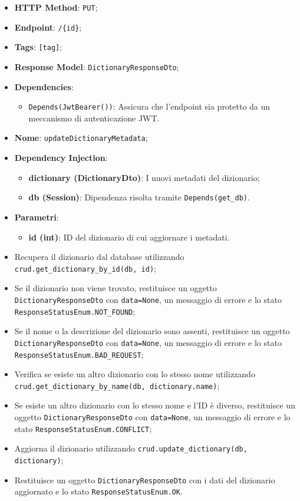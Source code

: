 \begin{itemize}
 \item \textbf{HTTP Method}: \texttt{PUT};
 \item \textbf{Endpoint}: \texttt{/\{id\}};
 \item \textbf{Tags}: \texttt{[tag]};
 \item \textbf{Response Model}: \texttt{DictionaryResponseDto};
 \item \textbf{Dependencies}:
  \begin{itemize}
    \item \texttt{Depends(JwtBearer())}: Assicura che l'endpoint sia protetto da un meccanismo di autenticazione JWT.
  \end{itemize}
 \item \textbf{Nome}: \texttt{updateDictionaryMetadata};
 \item \textbf{Dependency Injection}:
  \begin{itemize}
    \item \textbf{dictionary (DictionaryDto)}: I nuovi metadati del dizionario;
    \item \textbf{db (Session)}: Dipendenza risolta tramite \texttt{Depends(get\_db)}.
  \end{itemize}
 \item \textbf{Parametri}:
  \begin{itemize}
    \item \textbf{id (int)}: ID del dizionario di cui aggiornare i metadati.
  \end{itemize}
\end{itemize}

\begin{itemize}
 \item Recupera il dizionario dal database utilizzando \texttt{crud.get\_dictionary\_by\_id(db, id)};
 \item Se il dizionario non viene trovato, restituisce un oggetto \texttt{DictionaryResponseDto} con \texttt{data=None}, un messaggio di errore e lo stato \texttt{ResponseStatusEnum.NOT\_FOUND};
 \item Se il nome o la descrizione del dizionario sono assenti, restituisce un oggetto \texttt{DictionaryResponseDto} con \texttt{data=None}, un messaggio di errore e lo stato \texttt{ResponseStatusEnum.BAD\_REQUEST};
 \item Verifica se esiste un altro dizionario con lo stesso nome utilizzando \texttt{crud.get\_dictionary\_by\_name(db, dictionary.name)};
 \item Se esiste un altro dizionario con lo stesso nome e l'ID è diverso, restituisce un oggetto \texttt{DictionaryResponseDto} con \texttt{data=None}, un messaggio di errore e lo stato \texttt{ResponseStatusEnum.CONFLICT};
 \item Aggiorna il dizionario utilizzando \texttt{crud.update\_dictionary(db, dictionary)};
 \item Restituisce un oggetto \texttt{DictionaryResponseDto} con i dati del dizionario aggiornato e lo stato \texttt{ResponseStatusEnum.OK}.
\end{itemize}

